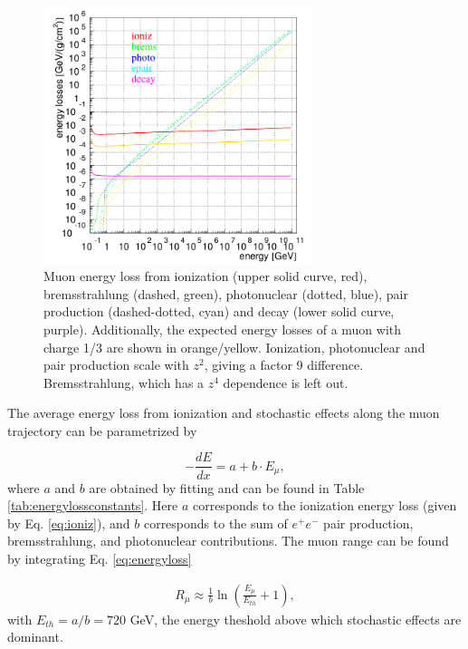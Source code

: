 \begin{figure}[t]
\centering
\includegraphics[width = 0.7\textwidth]{chapter4/img/muonenergyloss_extra.png}
\caption{Muon energy loss from ionization (upper solid curve, red), bremsstrahlung (dashed, green), photonuclear (dotted, blue), pair production (dashed-dotted, cyan) and decay (lower solid curve, purple). Additionally, the expected energy losses of a muon with charge 1/3 are shown in orange/yellow. Ionization, photonuclear and pair production scale with $z^2$, giving a factor 9 difference. Bremsstrahlung, which has a $z^4$ dependence is left out.}
\label{fig:energyloss}
\end{figure}

\noindent The average energy loss from ionization and stochastic effects along the muon trajectory can be parametrized by \cite{Barrett:1952woo} 

\begin{equation}
\label{eq:energyloss}
- \frac{dE}{dx} = a + b \cdot E_\mu,
\end{equation}
where $a$ and $b$ are obtained by fitting and can be found in Table \ref{tab:energylossconstants}. Here $a$ corresponds to the ionization energy loss (given by Eq. \ref{eq:ioniz}), and $b$ corresponds to the sum of $e^+e^-$ pair production, bremsstrahlung, and photonuclear contributions. The muon range can be found by integrating Eq. \ref{eq:energyloss}

\begin{equation}
\begin{split}
R_\mu \approx \frac{1}{b} \ln \left( \frac{E_\mu}{E_{th}} +1 \right),
\end{split}
\end{equation}
with $E_{th} = a/b = 720$ GeV, the energy theshold above which stochastic effects are dominant.\\


